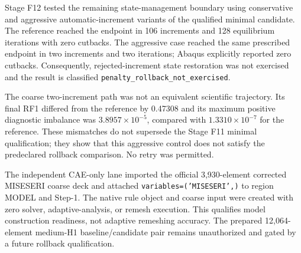Stage F12 tested the remaining state-management boundary using conservative
and aggressive automatic-increment variants of the qualified minimal
candidate. The reference reached the endpoint in 106 increments and 128
equilibrium iterations with zero cutbacks. The aggressive case reached the
same prescribed endpoint in two increments and two iterations; Abaqus
explicitly reported zero cutbacks. Consequently, rejected-increment state
restoration was not exercised and the result is classified
\texttt{penalty\_rollback\_not\_exercised}.

The coarse two-increment path was not an equivalent scientific trajectory.
Its final RF1 differed from the reference by 0.47308 and its maximum positive
diagnostic imbalance was $3.8957\times10^{-5}$, compared with
$1.3310\times10^{-7}$ for the reference. These mismatches do not supersede
the Stage F11 minimal qualification; they show that this aggressive control
does not satisfy the predeclared rollback comparison. No retry was permitted.

The independent CAE-only lane imported the official 3,930-element corrected
MISESERI coarse deck and attached
\texttt{variables=('MISESERI',)} to region MODEL and Step-1. The native rule
object and coarse input were created with zero solver, adaptive-analysis, or
remesh execution. This qualifies model construction readiness, not adaptive
remeshing accuracy. The prepared 12,064-element medium-H1 baseline/candidate
pair remains unauthorized and gated by a future rollback qualification.

